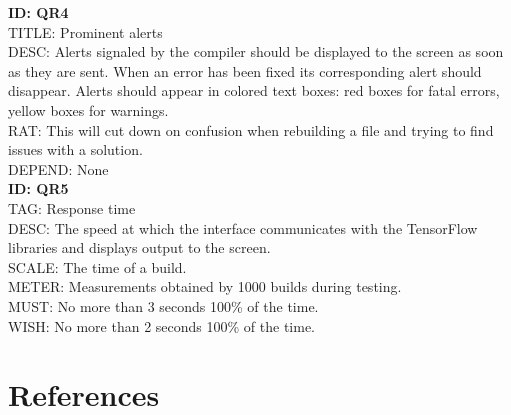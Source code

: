 \documentclass[journal,10pt,onecolumn,compsoc]{IEEEtran} \usepackage[margin=1.0in]{geometry} \usepackage{pdfpages} \usepackage{graphicx}
\begin{document}
\noindent
\textbf{ID: QR4}\\
TITLE: Prominent alerts\\
DESC: Alerts signaled by the compiler should be displayed to the screen as soon as they are sent. 
When an error has been fixed its corresponding alert should disappear.
Alerts should appear in colored text boxes: red boxes for fatal errors, yellow boxes for warnings.\\
RAT: This will cut down on confusion when rebuilding a file and trying to find issues with a solution.\\
DEPEND: None\\

\noindent
\textbf{ID: QR5}\\
TAG: Response time\\
DESC: The speed at which the interface communicates with the TensorFlow libraries and displays output to the screen.\\
SCALE: The time of a build.\\
METER: Measurements obtained by 1000 builds during testing.\\
MUST: No more than 3 seconds 100\% of the time.\\
WISH: No more than 2 seconds 100\% of the time.\\

\newpage


\newpage
\section{References}

\end{document}
